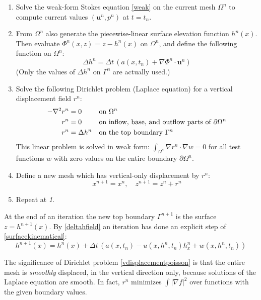 \documentclass[letterpaper,final,12pt,reqno]{amsart}
\newcommand{\grad}{\nabla}
\newcommand{\bu}{\mathbf{u}}
\begin{document}
\medskip
\renewcommand{\labelenumi}{\emph{\arabic{enumi}.}}
\begin{enumerate}
\item Solve the weak-form Stokes equation \eqref{weak} on the current mesh $\Omega^n$ to compute current values $(\bu^n,p^n)$ at $t=t_n$.
\item From $\Omega^n$ also generate the piecewise-linear surface elevation function $h^n(x)$.  Then evaluate $\Phi^n(x,z) = z - h^n(x)$ on $\Omega^n$, and define the following function on $\Omega^n$:
\begin{equation}
\Delta h^n =  \Delta t\,\left(a(x,t_n) + \grad \Phi^n\cdot \bu^n\right) \label{deltahfield}
\end{equation}
(Only the values of $\Delta h^n$ on $\Gamma^n$ are actually used.)
\item Solve the following Dirichlet problem (Laplace equation) for a vertical displacement field $r^n$:
\begin{align}
- \grad^2 r^n &= 0 & &\text{on } \Omega^n \label{vdisplacementpoisson} \\
          r^n &= 0 & &\text{on inflow, base, and outflow parts of } \partial \Omega^n \notag \\
          r^n &= \Delta h^n & &\text{on the top boundary } \Gamma^n \notag
\end{align}
This linear problem is solved in weak form: $\int_{\Omega^n} \grad r^n\cdot \grad w = 0$ for all test functions $w$ with zero values on the entire boundary $\partial \Omega^n$.
\item Define a new mesh which has vertical-only displacement by $r^n$:
\begin{equation}
  x^{n+1} = x^n, \quad z^{n+1} = z^n + r^n \label{updatemesh}
\end{equation}
\item Repeat at \emph{1}.
\end{enumerate}

\medskip
At the end of an iteration the new top boundary $\Gamma^{n+1}$ is the surface $z=h^{n+1}(x)$.  By \eqref{deltahfield} an iteration has done an explicit step of \eqref{surfacekinematical}:
    $$h^{n+1}(x) = h^n(x) + \Delta t\,\left(a(x,t_n) - u(x,h^n,t_n) h_x^n + w(x,h^n,t_n)\right)$$

The significance of Dirichlet problem \eqref{vdisplacementpoisson} is that the entire mesh is \emph{smoothly} displaced, in the vertical direction only, because solutions of the Laplace equation are smooth.  In fact, $r^n$ minimizes $\int |\grad f|^2$ over functions with the given boundary values.
\end{document}
